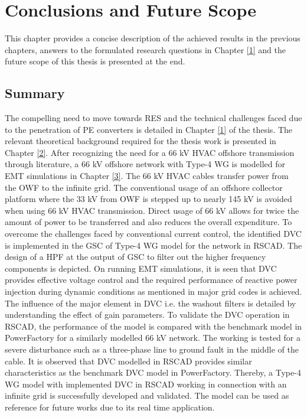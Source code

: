 \chapter{Conclusions and Future Scope}\label{6}

This chapter provides a concise description of the achieved results in the previous chapters, answers to the formulated research questions in Chapter \ref{1} and the future scope of this thesis is presented at the end.

\section{Summary}
The compelling need to move towards \gls{RES} and the technical challenges faced due to the penetration of \gls{PE} converters is detailed in Chapter \ref{1} of the thesis. The relevant theoretical background required for the thesis work is presented in Chapter \ref{2}. After recognizing the need for a 66 kV \gls{HVAC} offshore transmission through literature, a 66 kV offshore network with Type-4 \gls{WG} is modelled for \gls{EMT} simulations in Chapter \ref{3}. The 66 kV \gls{HVAC} cables transfer power from the \gls{OWF} to the infinite grid. The conventional usage of an offshore collector platform where the 33 kV from \gls{OWF} is stepped up to nearly 145 kV is avoided when using 66 kV \gls{HVAC} transmission. Direct usage of 66 kV allows for twice the amount of power to be transferred and also reduces the overall expenditure. To overcome the challenges faced by conventional current control, the identified \gls{DVC} is implemented in the \gls{GSC} of Type-4 \gls{WG} model for the network in RSCAD. The design of a \gls{HPF} at the output of \gls{GSC} to filter out the higher frequency components is depicted. On running \gls{EMT} simulations, it is seen that \gls{DVC} provides effective voltage control and the required performance of reactive power injection during dynamic conditions as mentioned in major grid codes \cite{mohseni_review_2012} is achieved. The influence of the major element in \gls{DVC} i.e. the washout filters is detailed by understanding the effect of gain parameters. To validate the \gls{DVC} operation in RSCAD, the performance of the model is compared with the benchmark model in PowerFactory \cite{korai_dynamic_2019} for a similarly modelled 66 kV network. The working is tested for a severe disturbance such as a three-phase line to ground fault in the middle of the cable. It is observed that \gls{DVC} modelled in RSCAD provides similar characteristics as the benchmark \gls{DVC} model in PowerFactory. Thereby, a Type-4 \gls{WG} model with implemented \gls{DVC} in RSCAD working in connection with an infinite grid is successfully developed and validated. The model can be used as reference for future works due to its real time application.  


